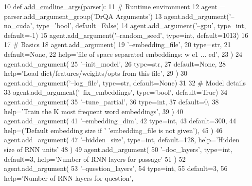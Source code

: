 \begin{DoxyCode}
10 \textcolor{keyword}{def }\hyperlink{namespaceparlai_1_1agents_1_1drqa_1_1config_a62fdd5554f1da6be0cba185271058320}{add\_cmdline\_args}(parser):
11     \textcolor{comment}{# Runtime environment}
12     agent = parser.add\_argument\_group(\textcolor{stringliteral}{'DrQA Arguments'})
13     agent.add\_argument(\textcolor{stringliteral}{'--no\_cuda'}, type=\textcolor{stringliteral}{'bool'}, default=\textcolor{keyword}{False})
14     agent.add\_argument(\textcolor{stringliteral}{'--gpu'}, type=int, default=-1)
15     agent.add\_argument(\textcolor{stringliteral}{'--random\_seed'}, type=int, default=1013)
16 
17     \textcolor{comment}{# Basics}
18     agent.add\_argument(
19         \textcolor{stringliteral}{'--embedding\_file'},
20         type=str,
21         default=\textcolor{keywordtype}{None},
22         help=\textcolor{stringliteral}{'file of space separated embeddings: w e1 ... ed'},
23     )
24     agent.add\_argument(
25         \textcolor{stringliteral}{'--init\_model'},
26         type=str,
27         default=\textcolor{keywordtype}{None},
28         help=\textcolor{stringliteral}{'Load dict/features/weights/opts from this file'},
29     )
30     agent.add\_argument(\textcolor{stringliteral}{'--log\_file'}, type=str, default=\textcolor{keywordtype}{None})
31 
32     \textcolor{comment}{# Model details}
33     agent.add\_argument(\textcolor{stringliteral}{'--fix\_embeddings'}, type=\textcolor{stringliteral}{'bool'}, default=\textcolor{keyword}{True})
34     agent.add\_argument(
35         \textcolor{stringliteral}{'--tune\_partial'},
36         type=int,
37         default=0,
38         help=\textcolor{stringliteral}{'Train the K most frequent word embeddings'},
39     )
40     agent.add\_argument(
41         \textcolor{stringliteral}{'--embedding\_dim'},
42         type=int,
43         default=300,
44         help=(\textcolor{stringliteral}{'Default embedding size if '} \textcolor{stringliteral}{'embedding\_file is not given'}),
45     )
46     agent.add\_argument(
47         \textcolor{stringliteral}{'--hidden\_size'}, type=int, default=128, help=\textcolor{stringliteral}{'Hidden size of RNN units'}
48     )
49     agent.add\_argument(
50         \textcolor{stringliteral}{'--doc\_layers'}, type=int, default=3, help=\textcolor{stringliteral}{'Number of RNN layers for passage'}
51     )
52     agent.add\_argument(
53         \textcolor{stringliteral}{'--question\_layers'},
54         type=int,
55         default=3,
56         help=\textcolor{stringliteral}{'Number of RNN layers for question'},

\end{DoxyCode}
